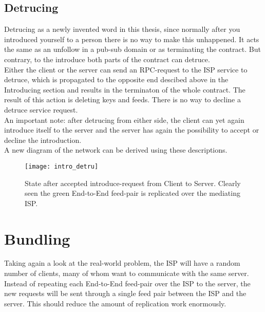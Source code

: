\subsection{Detrucing}
Detrucing as a newly invented word in this thesis, since normally after you introduced yourself to a person there is no way to make this unhappened. It acts the same as an unfollow in a pub-sub domain or as terminating the contract. But contrary, to the introduce both parts of the contract can detruce. \\
Either the client or the server can send an RPC-request to the ISP service to detruce, which is propagated to the opposite end descibed above in the Introducing section and results in the terminaton of the whole contract. The result of this action is deleting keys and feeds. There is no way to decline a detruce service request.
\\
An important note: after detrucing from either side, the client can yet again introduce itself to the server and the server has again the possibility to accept or decline the introduction.
\\
A new diagram of the network can be derived using these descriptions.
\begin{figure}
    \centering
    \texttt{[image: intro\_detru]}
    \caption{State after accepted introduce-request from Client to Server. Clearly seen the green End-to-End feed-pair is replicated over the mediating ISP.}
    \label{fig:contract_cli_isp}
\end{figure}

\pagebreak

\section{Bundling}
Taking again a look at the real-world problem, the ISP will have a random number of clients,  many of whom want to communicate with the same server. Instead of repeating each End-to-End feed-pair over the ISP to the server, the new requests will be sent through a single feed pair between the ISP and the server. This should reduce the amount of replication work enormously.

